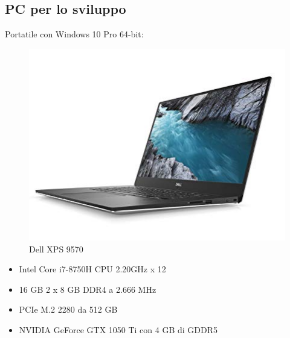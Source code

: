 \documentclass[twoside]{supsistudent}
\begin{document}
\subsection{PC per lo sviluppo}
Portatile con Windows 10 Pro 64-bit:
\begin{figure}[H]
  \center
  \includegraphics[scale=0.4]{images/pc.jpg}
  \caption{Dell XPS 9570}
\end{figure}
\begin{itemize}
  \item Intel Core i7-8750H CPU 2.20GHz x 12
  \item 16 GB 2 x 8 GB DDR4 a 2.666 MHz
  \item PCIe M.2 2280 da 512 GB
  \item NVIDIA GeForce GTX 1050 Ti con 4 GB di GDDR5
\end{itemize}
\newpage
\end{document}

